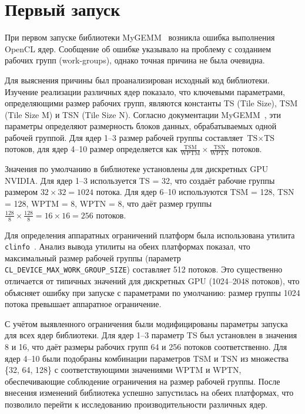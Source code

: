 
\section{Первый запуск}

При первом запуске библиотеки MyGEMM~\cite{mygemm_repo} возникла ошибка выполнения OpenCL ядер. Сообщение об ошибке указывало на проблему с созданием рабочих групп (work-groups), однако точная причина не была очевидна.

Для выяснения причины был проанализирован исходный код библиотеки. Изучение реализации различных ядер показало, что ключевыми параметрами, определяющими размер рабочих групп, являются константы TS (Tile Size), TSM (Tile Size M) и TSN (Tile Size N). Согласно документации MyGEMM~\cite{nugteren2018mygemm}, эти параметры определяют размерность блоков данных, обрабатываемых одной рабочей группой. Для ядер 1--3 размер рабочей группы составляет $\text{TS} \times \text{TS}$ потоков, для ядер 4--10 размер определяется как $\frac{\text{TSM}}{\text{WPTM}} \times \frac{\text{TSN}}{\text{WPTN}}$ потоков.

Значения по умолчанию в библиотеке установлены для дискретных GPU NVIDIA. Для ядер 1--3 используется TS = 32, что создаёт рабочие группы размером $32 \times 32 = 1024$ потока. Для ядер 6--10 используются TSM = 128, TSN = 128, WPTM = 8, WPTN = 8, что даёт размер группы $\frac{128}{8} \times \frac{128}{8} = 16 \times 16 = 256$ потоков.

Для определения аппаратных ограничений платформ была использована утилита \texttt{clinfo}~\cite{clinfo}. Анализ вывода утилиты на обеих платформах показал, что максимальный размер рабочей группы (параметр \texttt{CL\_DEVICE\_MAX\_WORK\_GROUP\_SIZE}) составляет 512 потоков. Это существенно отличается от типичных значений для дискретных GPU (1024--2048 потоков), что объясняет ошибку при запуске с параметрами по умолчанию: размер группы 1024 потока превышает аппаратное ограничение.

С учётом выявленного ограничения были модифицированы параметры запуска для всех ядер библиотеки. Для ядер 1--3 параметр TS был установлен в значения 8 и 16, что даёт размеры рабочих групп 64 и 256 потоков соответственно. Для ядер 4--10 были подобраны комбинации параметров TSM и TSN из множества \{32, 64, 128\} с соответствующими значениями WPTM и WPTN, обеспечивающие соблюдение ограничения на размер рабочей группы. После внесения изменений библиотека успешно запустилась на обеих платформах, что позволило перейти к исследованию производительности различных ядер.